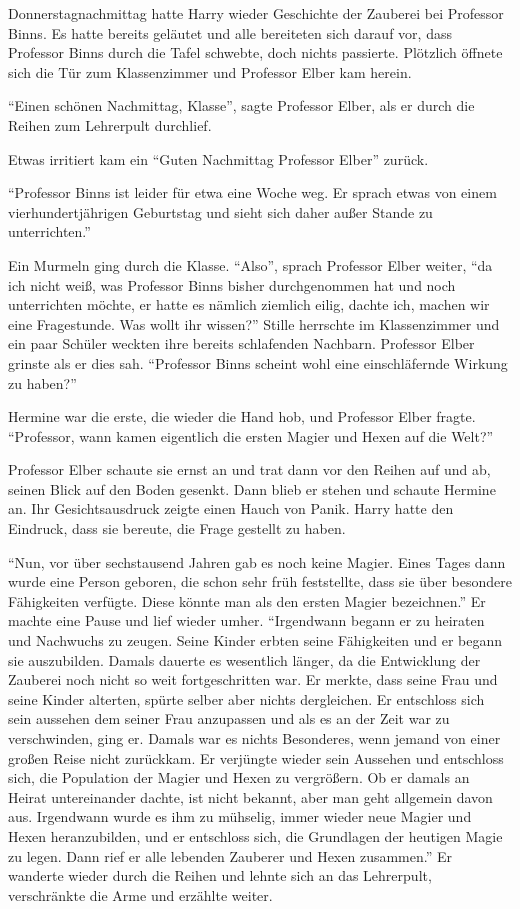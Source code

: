 \trenn

Donnerstagnachmittag hatte Harry wieder Geschichte der Zauberei bei Professor Binns. Es hatte bereits geläutet und alle bereiteten sich darauf vor, dass Professor Binns durch die Tafel schwebte, doch nichts passierte. Plötzlich öffnete sich die Tür zum Klassenzimmer und Professor Elber kam herein.

\enquote{Einen schönen Nachmittag, Klasse}, sagte Professor Elber, als er durch die Reihen zum Lehrerpult durchlief.

Etwas irritiert kam ein \enquote{Guten Nachmittag Professor Elber} zurück.

\enquote{Professor Binns ist leider für etwa eine Woche weg. Er sprach etwas von einem vierhundertjährigen Geburtstag und sieht sich daher außer Stande zu unterrichten.}

Ein Murmeln ging durch die Klasse. \enquote{Also}, sprach Professor Elber weiter, \enquote{da ich nicht weiß, was Professor Binns bisher durchgenommen hat und noch unterrichten möchte, er hatte es nämlich ziemlich eilig, dachte ich, machen wir eine Fragestunde. Was wollt ihr wissen?} Stille herrschte im Klassenzimmer und ein paar Schüler weckten ihre bereits schlafenden Nachbarn. Professor Elber grinste als er dies sah. \enquote{Professor Binns scheint wohl eine einschläfernde Wirkung zu haben?}

Hermine war die erste, die wieder die Hand hob, und Professor Elber fragte. \enquote{Professor, wann kamen eigentlich die ersten Magier und Hexen auf die Welt?}

Professor Elber schaute sie ernst an und trat dann vor den Reihen auf und ab, seinen Blick auf den Boden gesenkt. Dann blieb er stehen und schaute Hermine an. Ihr Gesichtsausdruck zeigte einen Hauch von Panik. Harry hatte den Eindruck, dass sie bereute, die Frage gestellt zu haben.

\enquote{Nun, vor über sechstausend Jahren gab es noch keine Magier. Eines Tages dann wurde eine Person geboren, die schon sehr früh feststellte, dass sie über besondere Fähigkeiten verfügte. Diese könnte man als den ersten Magier bezeichnen.} Er machte eine Pause und lief wieder umher. \enquote{Irgendwann begann er zu heiraten und Nachwuchs zu zeugen. Seine Kinder erbten seine Fähigkeiten und er begann sie auszubilden. Damals dauerte es wesentlich länger, da die Entwicklung der Zauberei noch nicht so weit fortgeschritten war. Er merkte, dass seine Frau und seine Kinder alterten, spürte selber aber nichts dergleichen. Er entschloss sich sein aussehen dem seiner Frau anzupassen und als es an der Zeit war zu verschwinden, ging er. Damals war es nichts Besonderes, wenn jemand von einer großen Reise nicht zurückkam. Er verjüngte wieder sein Aussehen und entschloss sich, die Population der Magier und Hexen zu vergrößern. Ob er damals an Heirat untereinander dachte, ist nicht bekannt, aber man geht allgemein davon aus. Irgendwann wurde es ihm zu mühselig, immer wieder neue Magier und Hexen heranzubilden, und er entschloss sich, die Grundlagen der heutigen Magie zu legen. Dann rief er alle lebenden Zauberer und Hexen zusammen.} Er wanderte wieder durch die Reihen und lehnte sich an das Lehrerpult, verschränkte die Arme und erzählte weiter.


